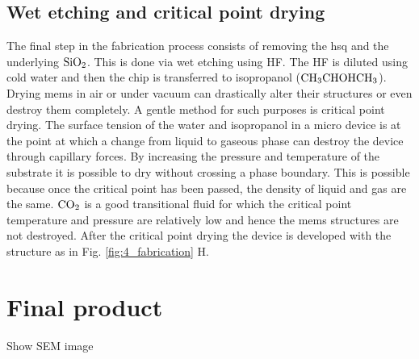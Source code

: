 \documentclass[../report.tex]{subfiles}
\begin{document}
\subsection{Wet etching and critical point drying}
The final step in the fabrication process consists of removing the \gls{hsq} and the underlying $\mathrm{SiO_2}$. This is done via wet etching using HF. The HF is diluted using cold water and then the chip is transferred to isopropanol ($\mathrm{CH_3CHOHCH_3}$). Drying \gls{mems} in air or under vacuum can drastically alter their structures or even destroy them completely. A gentle method for such purposes is critical point drying. The surface tension of the water and isopropanol in a micro device is at the point at which a change from liquid to gaseous phase can destroy the device through capillary forces. By increasing the pressure and temperature of the substrate it is possible to dry without crossing a phase boundary. This is possible because once the critical point has been passed, the density of liquid and gas are the same. $\mathrm{CO_2}$ is a good transitional fluid for which the critical point temperature and pressure are relatively low and hence the \gls{mems} structures are not destroyed. After the critical point drying the device is developed with the structure as in Fig. \ref{fig:4_fabrication} H. 


\section{Final product}

Show SEM image
\end{document}
